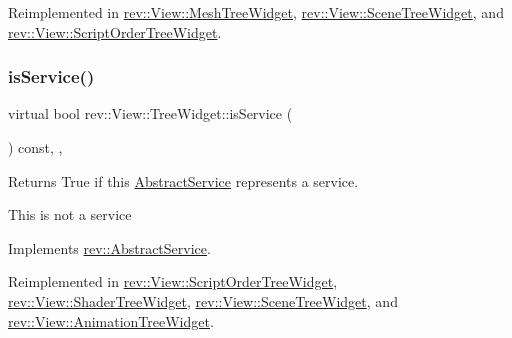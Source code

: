 Reimplemented in \mbox{\hyperlink{classrev_1_1_view_1_1_mesh_tree_widget_aede9f57981eaf35d876cd10dccd545fa}{rev\+::\+View\+::\+Mesh\+Tree\+Widget}}, \mbox{\hyperlink{classrev_1_1_view_1_1_scene_tree_widget_a262a8da9d0d6dd99cad8412030dfe1bb}{rev\+::\+View\+::\+Scene\+Tree\+Widget}}, and \mbox{\hyperlink{classrev_1_1_view_1_1_script_order_tree_widget_a0a4a2b3e4181c650d3843f3b80bf3b14}{rev\+::\+View\+::\+Script\+Order\+Tree\+Widget}}.

\mbox{\label{classrev_1_1_view_1_1_tree_widget_a9f10e939850acf8fce1992b5b9b3fc24}} 
\subsubsection{\texorpdfstring{isService()}{isService()}}
{\footnotesize\ttfamily virtual bool rev\+::\+View\+::\+Tree\+Widget\+::is\+Service (\begin{DoxyParamCaption}{ }\end{DoxyParamCaption}) const\hspace{0.3cm}{\ttfamily [inline]}, {\ttfamily [override]}, {\ttfamily [virtual]}}



Returns True if this \mbox{\hyperlink{classrev_1_1_abstract_service}{Abstract\+Service}} represents a service. 

This is not a service 

Implements \mbox{\hyperlink{classrev_1_1_abstract_service_a2ee1ad1b9d10a1d702d0a484e214b99d}{rev\+::\+Abstract\+Service}}.



Reimplemented in \mbox{\hyperlink{classrev_1_1_view_1_1_script_order_tree_widget_a3aaea671c375bfb363c9a324eccdecee}{rev\+::\+View\+::\+Script\+Order\+Tree\+Widget}}, \mbox{\hyperlink{classrev_1_1_view_1_1_shader_tree_widget_a96c9912919772ee91f5d2fdd1dd89b33}{rev\+::\+View\+::\+Shader\+Tree\+Widget}}, \mbox{\hyperlink{classrev_1_1_view_1_1_scene_tree_widget_aa9504c5744ff81177fdf79483a3e8dc5}{rev\+::\+View\+::\+Scene\+Tree\+Widget}}, and \mbox{\hyperlink{classrev_1_1_view_1_1_animation_tree_widget_a4c5c6bbdc22bd6f1385eade195ba5364}{rev\+::\+View\+::\+Animation\+Tree\+Widget}}.

\mbox{\label{classrev_1_1_view_1_1_tree_widget_a7ff55c9e8c83c70e9331a7fe7acafbb6}} 
